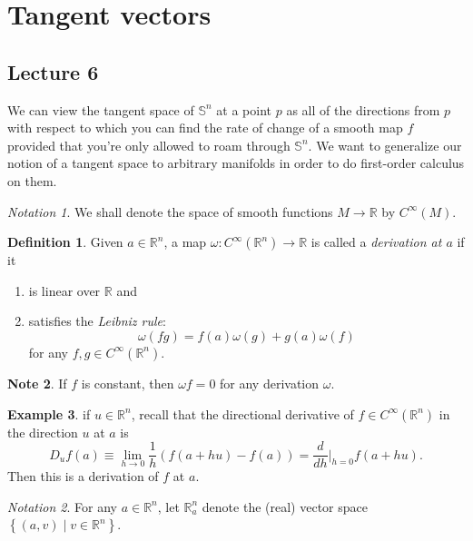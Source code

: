 \documentclass[10pt,letterpaper,cm]{nupset}
\theoremstyle{definition}
\newtheorem{definition}{Definition}[subsection]
\newtheorem{exmp}[definition]{Example}
\newtheorem{note}[definition]{Note}
\theoremstyle{theorem}
\theoremstyle{remark}
\newtheorem*{notation}{Notation}
\newcommand{\R}{\mathbb R}
\renewcommand{\S}{\mathbb S}
\newcommand{\1}{\mathbf{1}}
\newcommand{\0}{\vec 0}
\begin{document}
\section{Tangent vectors}

\subsection{Lecture 6}


We can view the tangent space of $\S^n$ at a point $p$ as all of the directions from $p$ with respect to which you can find the rate of change of a smooth map $f$ provided that you're only allowed to roam through $\S^n$. We want to generalize our notion of a tangent space to arbitrary manifolds in order to do first-order calculus on them.

\begin{notation}
We shall denote the space of smooth functions $M \to \R$ by $C^{\infty}(M)$.
\end{notation}

\begin{definition}
Given $a \in \R^n$, a map $\omega: C^{\infty}(\R^n) \to \R$ is called a \textit{derivation at $a$} if it
\begin{enumerate}[label=(\alph*)]
\item is linear over $\R$ and 
\item satisfies the \textit{Leibniz rule}:
$$\omega(fg) = f(a)\omega(g) + g(a) \omega(f)$$ for any $f, g \in C^{\infty}(\R^n).$
\end{enumerate}
\end{definition}

\begin{note}
If $f$ is constant, then $\omega f =0$ for any derivation $\omega$.
\end{note}

\begin{exmp}
if $u \in \R^n$, recall that the directional derivative of $f\in C^{\infty}(\R^n)$ in the direction $u$ at $a$ is $$D_uf(a) \equiv \lim_{h \to 0} \frac{1}{h}(f(a+hu) -f(a)) = \frac{d}{d{h}}\bigr\rvert_{h=0} f(a+hu).$$ Then this is a derivation of $f$ at $a$. 
\end{exmp}

\begin{notation}
For any $a\in \R^n$, let $\R_a^n$ denote the (real) vector space $\left\{\left(a,v\right) \mid v \in \R^n\right\}$.
\end{notation}
\end{document}
